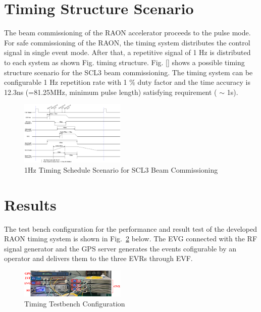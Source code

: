 \documentclass[journal,reqno]{IEEEtran}
\begin{document}
\section{Timing Structure Scenario}
The beam commissioning of the RAON accelerator proceeds to the pulse mode. For safe commissioning of the RAON, the timing system distributes the control signal in single event mode. After that, a repetitive signal of 1 Hz is distributed to each system as shown Fig. timing structure. Fig. [] shows a possible timing structure scenario for the SCL3 beam commissioning. The timing system can be configurable 1 Hz repetition rate with 1 \% duty factor and the time accuracy is 12.3ns (=81.25MHz, minimum pulse length) satisfying requirement ( $\sim$ 1s).


\begin{figure}[!htb]
	\centering
	\includegraphics*[width=0.45\textwidth, height=0.35\textwidth]{schedule.png}
	\caption{1Hz Timing Schedule Scenario for SCL3 Beam Commissioning}
	\label{schedule}
\end{figure}

\section{Results}
The test bench configuration for the performance and result test of the developed RAON timing system is shown in Fig.~\ref{timing_testbench} below. The EVG connected with the RF signal generator and the GPS server generates the events cofigurable by an operator and delivers them to the three EVRs through EVF.

\begin{figure}[!htb]
	\centering
	\includegraphics*[width=0.45\textwidth, height=0.12\textwidth]{img18.png}
	\caption{Timing Testbench Configuration}
	\label{timing_testbench}
\end{figure}
\end{document}
